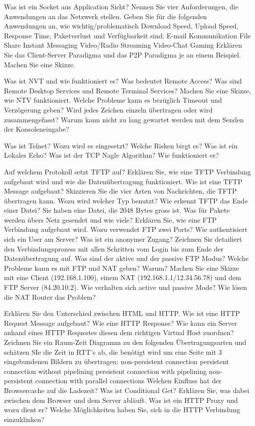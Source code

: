 \documentclass[ngerman,a4paper,12pt]{scrreprt}
\begin{document}
\olR
	\li Was ist ein Socket aus Application Sicht?
	\li Nennen Sie vier Anforderungen, die Anwendungen an das Netzwerk stellen.
	\li Geben Sie für die folgenden Anwendungen an, wie wichtig/problematisch Download Speed, Upload Speed, Response Time, Paketverlust und Verfügbarkeit sind:
		\ol
			\li E-mail Kommunikation
			\li File Share
			\li Instant Messaging
			\li Video/Radio Streaming
			\li Video-Chat
			\li Gaming
		\olE
	\li Erklären Sie das Client-Server Paradigma und das P2P Paradigma je an einem Beispiel. Machen Sie eine Skizze.
\olS

\olR
	\li Was ist NVT und wie funktioniert es? 
	\li Was bedeutet Remote Access?
	\li Was sind Remote Desktop Services und Remote Terminal Services?
	\li Machen Sie eine Skizze, wie NTV funktioniert. Welche Probleme kann es bezüglich Timeout und Verzögerung geben? Wird jedes Zeichen einzeln übertragen oder wird zusammengefasst? Warum kann nicht zu lang gewartet werden mit dem Senden der Konsoleneingabe?
\olS

\olR
	\li Was ist Telnet? Wozu wird es eingesetzt? Welche Risken birgt es?
	\li Was ist ein Lokales Echo?
	\li Was ist der TCP Nagle Algorithm? Wie funktioniert er?
\olS

\olR
	\li Auf welchem Protokoll setzt TFTP auf?
	\li Erklären Sie, wie eine TFTP Verbindung aufgebaut wird und wie die Datenübertragung funktioniert.
	\li Wie ist eine TFTP Message aufgebaut? Skizzieren Sie die vier Arten von Nachrichten, die TFTP übertragen kann. Wozu wird welcher Typ benutzt?
	\li Wie erkennt TFTP das Ende einer Datei?
	\li Sie haben eine Datei, die 2048 Bytes gross ist. Was für Pakete werden übers Netz gesendet und wie viele?
	\li Erklären Sie, wie eine FTP Verbindung aufgebaut wird. Wozu verwendet FTP zwei Ports?
	\li Wie authentisiert sich ein User am Server? Was ist ein anonymer Zugang?
	\li Zeichnen Sie detailiert den Verbindungsprozess mit allen Schritten vom Login bis zum Ende der Datenübertragung auf.
	\li Was sind der aktive und der passive FTP Modus?
	\li Welche Probleme kann es mit FTP und NAT geben? Warum? Machen Sie eine Skizze mit eine Client (192.168.1.100), einem NAT (192.168.1.1/12.34.56.78) und dem FTP Server (84.20.10.2). Wie verhalten sich active und passive Mode? Wie lösen die NAT Router das Problem?
\olS

\olR
	\li Erklären Sie den Unterschied zwischen HTML und HTTP.
	\li Wie ist eine HTTP Request Message aufgebaut? Wie eine HTTP Response?
	\li Wie kann ein Server anhand eines HTTP Requestes diesen dem richtigen Virtual Host zuordnen?
	\li Zeichnen Sie ein Raum-Zeit Diagramm zu den folgenden Übertragungsarten und schätzen SIe die Zeit in RTT's ab, die benötigt wird um eine Seite mit 3 eingebundenen Bildern zu übertragen:
		\ol
			\li non-persistent connection
			\li persistent connection without pipelining
			\li persistent connection with pipelining
			\li non-persistent connection with parallel connections
		\olE
	\li Welchen Einfluss hat der Browsercache auf die Ladezeit?
	\li Was ist Conditional Get? Erklären Sie, was dabei zwischen dem Browser und dem Server abläuft.
	\li Was ist ein HTTP Proxy und wozu dient er?
	\li Welche Möglichkeiten haben Sie, sich in die HTTP Verbindung einzuklinken?
\olE
\end{document}
